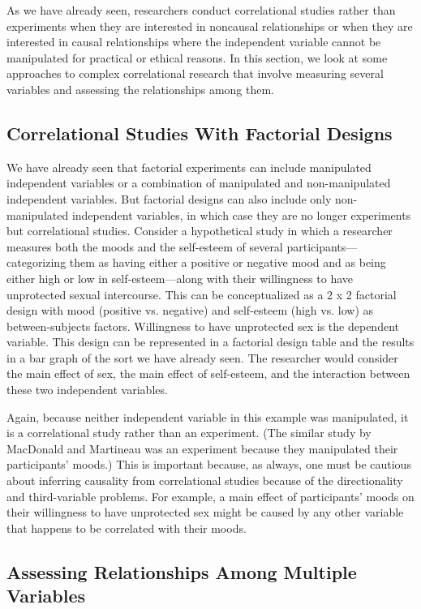 As we have already seen, researchers conduct correlational studies rather than experiments when they are interested in noncausal relationships or when they are interested in causal relationships where the independent variable cannot be manipulated for practical or ethical reasons. In this section, we look at some approaches to complex correlational research that involve measuring several variables and assessing the relationships among them.

\subsection{Correlational Studies With Factorial Designs}

We have already seen that factorial experiments can include manipulated independent variables or a combination of manipulated and non-manipulated independent variables. But factorial designs can also include only non- manipulated independent variables, in which case they are no longer experiments but correlational studies. Consider a hypothetical study in which a researcher measures both the moods and the self-esteem of several participants---categorizing them as having either a positive or negative mood and as being either high or low in self-esteem---along with their willingness to have unprotected sexual intercourse. This can be conceptualized as a 2 x 2 factorial design with mood (positive vs. negative) and self-esteem (high vs. low) as between-subjects factors. Willingness to have unprotected sex is the dependent variable. This design can be represented in a factorial design table and the results in a bar graph of the sort we have already seen. The researcher would consider the main effect of sex, the main effect of self-esteem, and the interaction between these two independent variables.

Again, because neither independent variable in this example was manipulated, it is a correlational study rather than an experiment. (The similar study by MacDonald and Martineau \citeyear{macdonald_self-esteem_2002} was an experiment because they manipulated their participants' moods.) This is important because, as always, one must be cautious about inferring causality from correlational studies because of the directionality and third-variable problems. For example, a main effect of participants' moods on their willingness to have unprotected sex might be caused by any other variable that happens to be correlated with their moods.

\subsection{Assessing Relationships Among Multiple Variables}

